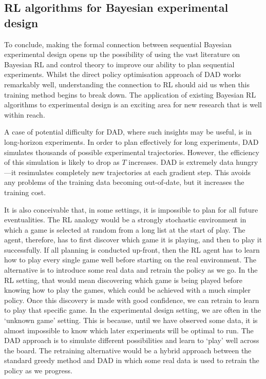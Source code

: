 \documentclass[a4paper, 10pt]{report}
\theoremstyle{plain}
\begin{document}
	\subsection{RL algorithms for Bayesian experimental design}
	To conclude, making the formal connection between sequential Bayesian experimental design opens up the possibility of using the vast literature on Bayesian RL and control theory to improve our ability to plan sequential experiments.
	Whilst the direct policy optimisation approach of DAD works remarkably well, understanding the connection to RL should aid us when this training method begins to break down.
	The application of existing Bayesian RL algorithms to experimental design is an exciting area for new research that is well within reach.
	
	A case of potential difficulty for DAD, where such insights may be useful, is in long-horizon experiments. 
	In order to plan effectively for long experiments, DAD simulates thousands of possible experimental trajectories.
	However, the efficiency of this simulation is likely to drop as $T$ increases.
	DAD is extremely data hungry---it resimulates completely new trajectories at each gradient step.
	This avoids any problems of the training data becoming out-of-date, but it increases the training cost.
	
	
	It is also conceivable that, in some settings, it is impossible to plan for all future eventualities.
	The RL analogy would be a strongly stochastic environment in which a game is selected at random from a long list at the start of play.
	The agent, therefore, has to first discover which game it is playing, and then to play it successfully.
	If all planning is conducted up-front, then the RL agent has to learn how to play every single game well before starting on the real environment.
	The alternative is to introduce some real data and retrain the policy as we go.
	In the RL setting, that would mean discovering which game is being played before knowing how to play the games, which could be achieved with a much simpler policy.
	Once this discovery is made with good confidence, we can retrain to learn to play that specific game.
	In the experimental design setting, we are often in the `unknown game' setting. 
	This is because, until we have observed some data, it is almost impossible to know which later experiments will be optimal to run.
	The DAD approach is to simulate different possibilities and learn to `play' well across the board.
	The retraining alternative would be a hybrid approach between the standard greedy method and DAD in which some real data is used to retrain the policy as we progress.
	
\end{document}
